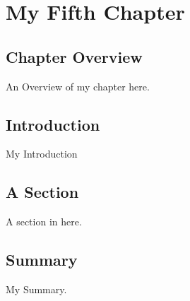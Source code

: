 \chapter{My Fifth Chapter}

\section{Chapter Overview}

An Overview of my chapter here.

\section{Introduction}

My Introduction

\section{A Section}

A section in here.

\section{Summary }

My Summary.
